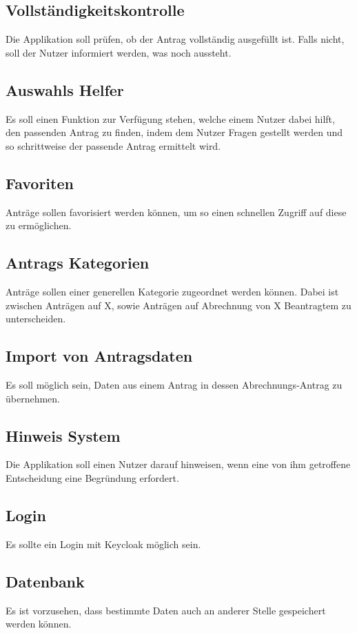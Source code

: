 \subsection{Vollständigkeitskontrolle}\label{subsec:vollstandigkeitskontrolle}
Die Applikation soll prüfen, ob der Antrag vollständig ausgefüllt ist.
Falls nicht, soll der Nutzer informiert werden, was noch aussteht.
\subsection{Auswahls Helfer}\label{subsec:auswahls-helfer}
Es soll einen Funktion zur Verfügung stehen, welche einem Nutzer dabei hilft,
den passenden Antrag zu finden, indem dem Nutzer Fragen gestellt werden und so schrittweise der passende Antrag ermittelt wird.
\subsection{Favoriten}\label{subsec:favoriten}
Anträge sollen favorisiert werden können, um so einen schnellen Zugriff auf diese zu ermöglichen.
\subsection{Antrags Kategorien}\label{subsec:antrags-kategorien}
Anträge sollen einer generellen Kategorie zugeordnet werden können.
Dabei ist zwischen Anträgen auf X, sowie Anträgen auf Abrechnung von X Beantragtem zu unterscheiden.
\subsection{Import von Antragsdaten}\label{subsec:import-von-antragsdaten}
Es soll möglich sein, Daten aus einem Antrag in dessen Abrechnungs-Antrag zu übernehmen.
\subsection{Hinweis System}\label{subsec:hinweis-system}
Die Applikation soll einen Nutzer darauf hinweisen, wenn eine von ihm getroffene Entscheidung eine Begründung erfordert.
\subsection{Login}\label{subsec:login}
Es sollte ein Login mit Keycloak möglich sein.
\subsection{Datenbank}\label{subsec:datenbank}
Es ist vorzusehen, dass bestimmte Daten auch an anderer Stelle gespeichert werden können.
